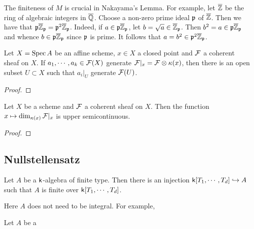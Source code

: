     \begin{remark}\label{rem: counterexample of Nakayama's lemma when M is not finite}
        The finiteness of $M$ is crucial in Nakayama's Lemma.
        For example, let \(\overline{{\mathbb{Z}}}\) be the ring of algebraic integers in \(\overline{{\mathbb{Q}}}\).
        Choose a non-zero prime ideal \({\mathfrak{p}}\) of \(\overline{{\mathbb{Z}}}\).
        Then we have that \({\mathfrak{p}} \overline{{\mathbb{Z}}}_{\mathfrak{p}}= {\mathfrak{p}}^2 \overline{{\mathbb{Z}}}_{\mathfrak{p}}\).
        Indeed, if \(a \in {\mathfrak{p}} \overline{{\mathbb{Z}}}_{\mathfrak{p}}\), let \(b = \sqrt{a} \in \overline{{\mathbb{Z}}}_{\mathfrak{p}}\).
        Then \(b^2 = a \in {\mathfrak{p}} \overline{{\mathbb{Z}}}_{\mathfrak{p}}\) and whence \(b \in {\mathfrak{p}} \overline{{\mathbb{Z}}}_{\mathfrak{p}}\) since \({\mathfrak{p}}\) is prime.
        It follows that \(a = b^2 \in {\mathfrak{p}}^2 \overline{{\mathbb{Z}}}_{\mathfrak{p}}\).
    \end{remark}

    \begin{proposition}\label{prop: geometric form of Nakayama's lemma}
        Let $X = \operatorname{Spec} A$ be an affine scheme, $x\in X$ a closed point and ${\mathcal{F}}$ a coherent sheaf on $X$.
        If $a_1,\cdots,a_k \in {\mathcal{F}}(X)$ generate ${\mathcal{F}}|_x = {\mathcal{F}} \otimes {\kappa}(x)$, then there is an open subset $U \subset X$ such that $a_i|_U$ generate ${\mathcal{F}}(U)$. 
    \end{proposition}
    \begin{proof}
    \end{proof}

    \begin{corollary}\label{cor: upper semicontinuity of dimension of restriction of coherent sheaf to fiber}
        Let \(X\) be a scheme and \({\mathcal{F}}\) a coherent sheaf on \(X\).
        Then the function \(x \mapsto \dim_{{\kappa}(x)} {\mathcal{F}}|_x\) is upper semicontinuous.
    \end{corollary}
    \begin{proof}
    \end{proof}

\subsection{Nullstellensatz}

    \begin{theorem}\label{thm: Noether's Normalization Lemma}
        Let $A$ be a ${\mathsf{k}}$-algebra of finite type.
        Then there is an injection ${\mathsf{k}}[T_1,\cdots,T_d] \hookrightarrow A$ such that $A$ is finite over ${\mathsf{k}}[T_1,\cdots,T_d]$.
    \end{theorem}

    \begin{remark}
        Here $A$ does not need to be integral. 
        For example, 
    \end{remark}

    \begin{theorem}\label{thm: Nullstellensatz}
        Let $A$ be a 
    \end{theorem}
